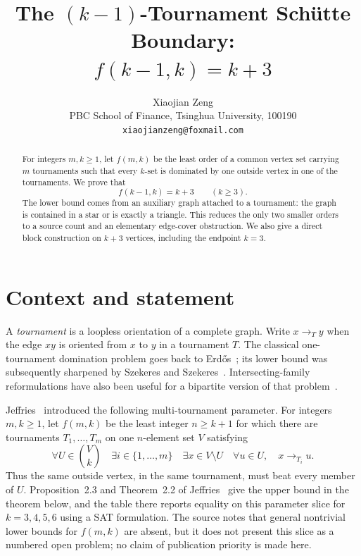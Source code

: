 \documentclass[11pt]{article}
\title{The $(k-1)$-Tournament Sch\"utte Boundary:\\
       $f(k-1,k)=k+3$}
\author{Xiaojian Zeng\\
PBC School of Finance, Tsinghua University, 100190\\
\texttt{xiaojianzeng@foxmail.com}}
\date{}
\begin{document}
\maketitle

\begin{abstract}
For integers $m,k\geq 1$, let $f(m,k)$ be the least order of a common
vertex set carrying $m$ tournaments such that every $k$-set is dominated
by one outside vertex in one of the tournaments.  We prove that
\[
    f(k-1,k)=k+3 \qquad (k\geq 3).
\]
The lower bound comes from an auxiliary graph attached to a tournament:
the graph is contained in a star or is exactly a triangle.  This reduces
the only two smaller orders to a source count and an elementary edge-cover
obstruction.  We also give a direct block construction on $k+3$ vertices,
including the endpoint $k=3$.
\end{abstract}

\section{Context and statement}

A \emph{tournament} is a loopless orientation of a complete graph.  Write
$x\to_T y$ when the edge $xy$ is oriented from $x$ to $y$ in a tournament
$T$.  The classical one-tournament domination problem goes back to
Erd\H{o}s~\cite{Erdos1963}; its lower bound was subsequently sharpened by
Szekeres and Szekeres~\cite{SzekeresSzekeres1965}.  Intersecting-family
reformulations have also been useful for a bipartite version of that
problem~\cite{BorowieckiEtAl2003}.

Jeffries~\cite{Jeffries2026} introduced the following multi-tournament
parameter.  For integers $m,k\geq1$, let $f(m,k)$ be the least integer
$n\geq k+1$ for which there are tournaments $T_1,\ldots,T_m$ on one
$n$-element set $V$ satisfying
\begin{equation}\label{eq:property}
  \forall U\in\binom{V}{k}\quad
  \exists i\in\{1,\ldots,m\}\quad
  \exists x\in V\setminus U\quad
  \forall u\in U,\quad x\to_{T_i}u.
\end{equation}
Thus the same outside vertex, in the same tournament, must beat every
member of $U$.  Proposition~2.3 and Theorem~2.2 of
Jeffries~\cite{Jeffries2026} give the upper bound in the theorem below,
and the table there reports equality on this parameter slice for
$k=3,4,5,6$ using a SAT formulation.  The source notes that general
nontrivial lower bounds for $f(m,k)$ are absent, but it does not present
this slice as a numbered open problem; no claim of publication priority is
made here.
\end{document}
